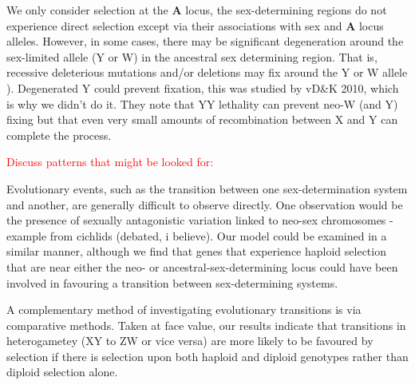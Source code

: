 \documentclass[12pt]{article}
\begin{document}

We only consider selection at the \textbf{A} locus, the sex-determining regions do not experience direct selection except via their associations with sex and \textbf{A} locus alleles. 
However, in some cases, there may be significant degeneration around the sex-limited allele (Y or W) in the ancestral sex determining region. That is, recessive deleterious mutations and/or deletions may fix around the Y or W allele \citealt{Rice:1996ke,Charlesworth:2000cc,Bachtrog:2006ed,Marais:2008hm}). 
Degenerated Y could prevent fixation, this was studied by vD\&K 2010, which is why we didn't do it. 
They note that YY lethality can prevent neo-W (and Y) fixing but that even very small amounts of recombination between X and Y can complete the process. 


\textcolor{red}{\noindent Discuss patterns that might be looked for:}

Evolutionary events, such as the transition between one sex-determination system and another, are generally difficult to observe directly. 
One observation would be the presence of sexually antagonistic variation linked to neo-sex chromosomes - example from cichlids (debated, i believe). 
Our model could be examined in a similar manner, although we find that genes that experience haploid selection that are near either the neo- or ancestral-sex-determining locus could have been involved in favouring a transition between sex-determining systems. 

A complementary method of investigating evolutionary transitions is via comparative methods. 
Taken at face value, our results indicate that transitions in heterogametey (XY to ZW or vice versa) are more likely to be favoured by selection if there is selection upon both haploid and diploid genotypes rather than diploid selection alone. 
\end{document}
